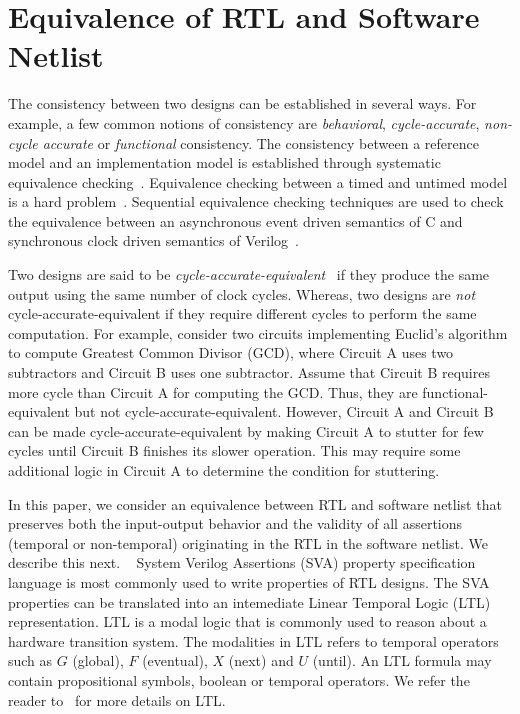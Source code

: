 \section{Equivalence of RTL and Software Netlist}
%
The consistency between two designs can be established in several ways. 
For example, a few common notions of consistency are \emph{behavioral}, 
\emph{cycle-accurate}, \emph{non-cycle accurate} or \emph{functional}
consistency.  The consistency between a reference model and an implementation
model is established through systematic equivalence 
checking~\cite{CKY03,DBLP:conf/date/KoelblJJP09,DBLP:journals/tcad/StoffelK04,
DBLP:conf/date/Eijk98,DBLP:conf/iccd/BaumgartnerMPKJ06}.  Equivalence checking between a timed and untimed model is a hard
problem~\cite{kuehlmann2002combinational}.  Sequential equivalence checking techniques 
are used to check the equivalence between an asynchronous event driven semantics of C and synchronous 
clock driven semantics of Verilog~\cite{CKY03, DBLP:conf/iccd/BaumgartnerMPKJ06}.


Two designs are said to be \emph{cycle-accurate-equivalent}~\cite{cycle,kuehlmann2002combinational} 
if they produce the same output using the same number of clock cycles.   
Whereas, two designs are \emph{not} cycle-accurate-equivalent if they require 
different cycles to perform the same computation. For example, consider two circuits
implementing Euclid's algorithm to compute Greatest Common Divisor (GCD),
where Circuit A uses two subtractors and Circuit B uses one subtractor. Assume that 
Circuit B requires more cycle than Circuit A for computing the GCD. Thus,
they are functional-equivalent but not cycle-accurate-equivalent. However,
Circuit A and Circuit B can be made cycle-accurate-equivalent by making Circuit
A to stutter for few cycles until Circuit B finishes its slower operation.  This
may require some additional logic in Circuit A to determine the condition for 
stuttering.  


In this paper, we consider an equivalence between RTL and software netlist 
that preserves both the input-output behavior and the validity of all assertions 
(temporal or non-temporal) originating in the RTL in the software netlist.  
We describe this next.
% 
~\label{prop}
%
System Verilog Assertions (SVA) property specification language is most commonly used 
to write properties of RTL designs.  The SVA properties can be translated 
into an intemediate Linear Temporal Logic (LTL)~\cite{DBLP:journals/jacm/SistlaC85} 
representation.  LTL is a modal logic that is commonly used to reason about a hardware 
transition system.  The modalities in LTL refers to
temporal operators such as $G$ (global), $F$ (eventual), $X$ (next) and $U$
(until).  An LTL formula may contain propositional symbols, boolean or temporal
operators.  We refer the reader to~\cite{DBLP:journals/jacm/SistlaC85,mc-book} 
for more details on LTL. 



